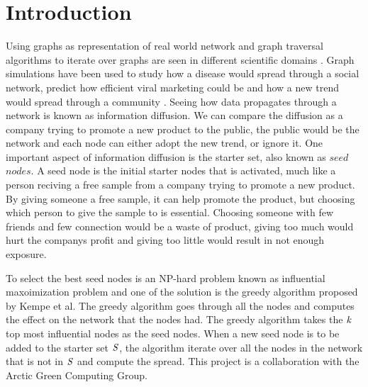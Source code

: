 \chapter{Introduction} \label{intro}

Using graphs as representation of real world network and graph traversal algorithms to iterate over graphs are seen in different scientific domains \cite{HybridBFS2015}. Graph simulations have been used to study how a disease would spread through a social network\cite{DiseasOutbreak}, predict how efficient viral marketing could be \cite{ViralMarketing} and how a new trend would spread through a community \cite{MaximizeSpread2003}. Seeing how data propagates through a network is known as information diffusion. We can compare the diffusion as a company trying to promote a new product to the public, the public would be the network and each node can either adopt the new trend, or ignore it. One important aspect of information diffusion is the starter set, also known as $seed$ $nodes$. A seed node is the initial starter nodes that is activated, much like a person reciving a free sample from a company trying to promote a new product. By giving someone a free sample, it can help promote the product, but choosing which person to give the sample to is essential. Choosing someone with few friends and few connection would be a waste of product, giving too much would hurt the companys profit and giving too little would result in not enough exposure.

To select the best seed nodes is an NP-hard problem known as influential maxoimization problem \cite{MaximizeSpread2003} and one of the solution is the greedy algorithm \cite{MaximizeSpread2015} proposed by Kempe et al. The greedy algorithm goes through all the nodes and computes the effect on the network that the nodes had. The greedy algorithm takes the $\it{k}$ top most influential nodes as the seed nodes. When a new seed node is to be added to the starter set $\it{S}$, the algorithm iterate over all the nodes in the network that is not in $\it{S}$ and compute the spread. This project is a collaboration with the Arctic Green Computing Group. 



